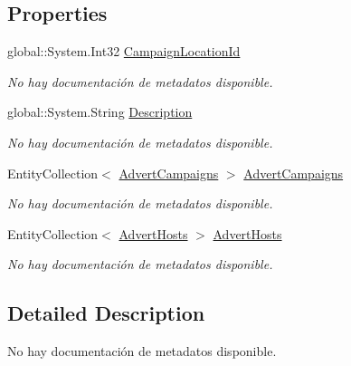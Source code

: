 \subsection*{Properties}
\begin{DoxyCompactItemize}
\item 
global\-::\-System.\-Int32 \hyperlink{class_game_memory_1_1_campaign_locations_a274c121c958554b8ab18ef8b4d2aaf92}{Campaign\-Location\-Id}
\begin{DoxyCompactList}\small\item\em No hay documentación de metadatos disponible. \end{DoxyCompactList}\item 
global\-::\-System.\-String \hyperlink{class_game_memory_1_1_campaign_locations_a8cff8e401fb34c18237a7170f521f661}{Description}
\begin{DoxyCompactList}\small\item\em No hay documentación de metadatos disponible. \end{DoxyCompactList}\item 
Entity\-Collection$<$ \hyperlink{class_game_memory_1_1_advert_campaigns}{Advert\-Campaigns} $>$ \hyperlink{class_game_memory_1_1_campaign_locations_a01592ca172f3fc4a7342aa232aefb2c5}{Advert\-Campaigns}
\begin{DoxyCompactList}\small\item\em No hay documentación de metadatos disponible. \end{DoxyCompactList}\item 
Entity\-Collection$<$ \hyperlink{class_game_memory_1_1_advert_hosts}{Advert\-Hosts} $>$ \hyperlink{class_game_memory_1_1_campaign_locations_a5cd8ae0985a1191321033d26d09c5231}{Advert\-Hosts}
\begin{DoxyCompactList}\small\item\em No hay documentación de metadatos disponible. \end{DoxyCompactList}\end{DoxyCompactItemize}


\subsection{Detailed Description}
No hay documentación de metadatos disponible. 



